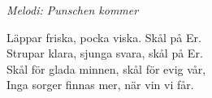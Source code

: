 {\footnotesize\textit{Melodi: Punschen kommer}}\par
\vspace{10pt}
Läppar friska, pocka viska. Skål på Er.\\
Strupar klara, sjunga svara, skål på Er.\\
Skål för glada minnen, skål för evig vår,\\
Inga sorger finnas mer, när vin vi får.
